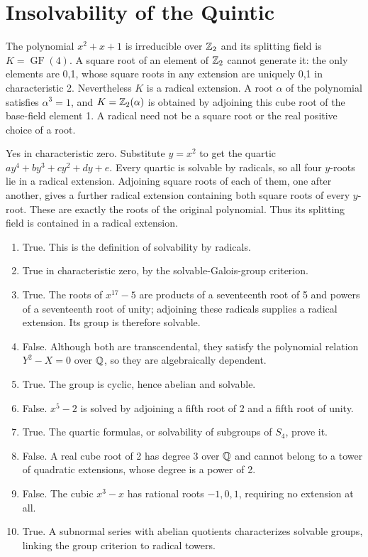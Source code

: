 \section{Insolvability of the Quintic}

The polynomial $x^2+x+1$ is irreducible over $\mathbb{Z}_2$ and its splitting field is $K=\operatorname{GF}(4)$. A square root of an element of $\mathbb{Z}_2$ cannot generate it: the only elements are 0,1, whose square roots in any extension are uniquely 0,1 in characteristic 2. Nevertheless $K$ is a radical extension. A root $\alpha$ of the polynomial satisfies $\alpha^3=1$, and $K=\mathbb{Z}_2(\alpha)$ is obtained by adjoining this cube root of the base-field element 1. A radical need not be a square root or the real positive choice of a root.

Yes in characteristic zero. Substitute $y=x^2$ to get the quartic $ay^4+by^3+cy^2+dy+e$. Every quartic is solvable by radicals, so all four $y$-roots lie in a radical extension. Adjoining square roots of each of them, one after another, gives a further radical extension containing both square roots of every $y$-root. These are exactly the roots of the original polynomial. Thus its splitting field is contained in a radical extension.

\begin{enumerate}[label=(\alph*)]
\item True. This is the definition of solvability by radicals.
\item True in characteristic zero, by the solvable-Galois-group criterion.
\item True. The roots of $x^{17}-5$ are products of a seventeenth root of 5 and powers of a seventeenth root of unity; adjoining these radicals supplies a radical extension. Its group is therefore solvable.
\item False. Although both are transcendental, they satisfy the polynomial relation $Y^2-X=0$ over $\mathbb{Q}$, so they are algebraically dependent.
\item True. The group is cyclic, hence abelian and solvable.
\item False. $x^5-2$ is solved by adjoining a fifth root of 2 and a fifth root of unity.
\item True. The quartic formulas, or solvability of subgroups of $S_4$, prove it.
\item False. A real cube root of 2 has degree 3 over $\mathbb{Q}$ and cannot belong to a tower of quadratic extensions, whose degree is a power of 2.
\item False. The cubic $x^3-x$ has rational roots $-1,0,1$, requiring no extension at all.
\item True. A subnormal series with abelian quotients characterizes solvable groups, linking the group criterion to radical towers.
\end{enumerate}

